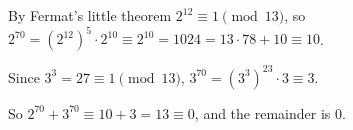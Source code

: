 By Fermat's little theorem $2^{12}\equiv1\pmod{13}$, so $2^{70}=\left(2^{12}\right)^5\cdot2^{10}\equiv2^{10}=1024=13\cdot78+10\equiv10$.

Since $3^3=27\equiv1\pmod{13}$, $3^{70}=\left(3^3\right)^{23}\cdot3\equiv3$.

So $2^{70}+3^{70}\equiv10+3=13\equiv0$, and the remainder is $\boxed{0}$.
